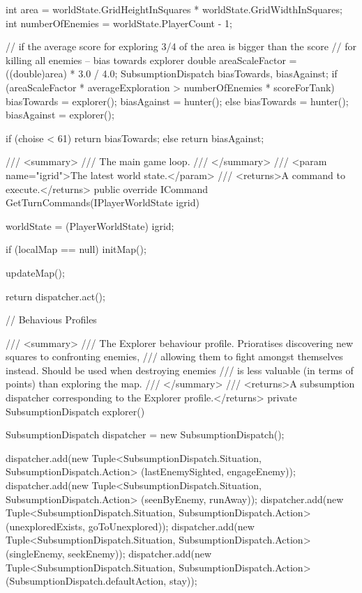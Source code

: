 \documentclass[11pt]{article}
\begin{document}
\begin{code}
{{{            int area = worldState.GridHeightInSquares * worldState.GridWidthInSquares;
            int numberOfEnemies = worldState.PlayerCount - 1;

            // if the average score for exploring 3/4 of the area is bigger than the score
            // for killing all enemies -- bias towards explorer
            double areaScaleFactor = ((double)area) * 3.0 / 4.0;
            SubsumptionDispatch biasTowards, biasAgainst;
            if (areaScaleFactor * averageExploration > numberOfEnemies * scoreForTank)
            {
                biasTowards = explorer();
                biasAgainst = hunter();
            }
            else
            {
                biasTowards = hunter();
                biasAgainst = explorer();
            }

            if (choise < 61)
            {
                return biasTowards;
            }
            else
            {
                return biasAgainst;
            }
        }

        /// <summary>
        /// The main game loop.
        /// </summary>
        /// <param name="igrid">The latest world state.</param>
        /// <returns>A command to execute.</returns>
        public override ICommand GetTurnCommands(IPlayerWorldState igrid)
        {
            worldState = (PlayerWorldState) igrid;

            if (localMap == null)
            {
                initMap();
            }

            updateMap();

            return dispatcher.act();
        }

        // Behavious Profiles

        /// <summary>
        /// The Explorer behaviour profile. Prioratises discovering new squares to confronting enemies,
        /// allowing them to fight amongst themselves instead. Should be used when destroying enemies
        /// is less valuable (in terms of points) than exploring the map.
        /// </summary>
        /// <returns>A subsumption dispatcher corresponding to the Explorer profile.</returns>
        private SubsumptionDispatch explorer()
        {
            SubsumptionDispatch dispatcher = new SubsumptionDispatch();

            dispatcher.add(new Tuple<SubsumptionDispatch.Situation, SubsumptionDispatch.Action>
                (lastEnemySighted, engageEnemy));
            dispatcher.add(new Tuple<SubsumptionDispatch.Situation, SubsumptionDispatch.Action>
                (seenByEnemy, runAway));
            dispatcher.add(new Tuple<SubsumptionDispatch.Situation, SubsumptionDispatch.Action>
                (unexploredExists, goToUnexplored));
            dispatcher.add(new Tuple<SubsumptionDispatch.Situation, SubsumptionDispatch.Action>
                (singleEnemy, seekEnemy));
            dispatcher.add(new Tuple<SubsumptionDispatch.Situation, SubsumptionDispatch.Action>
                (SubsumptionDispatch.defaultAction, stay));
            
}}}
\end{code}
\end{document}

